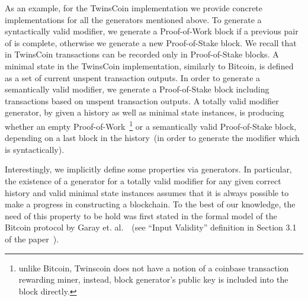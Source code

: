 As an example, for the TwinsCoin implementation we provide concrete implementations for all the generators mentioned above. To generate a syntactically valid modifier, we generate a Proof-of-Work block if a previous pair of {\em<Proof-of-Work block, Proof-of-Stake block>} is complete, otherwise we generate a new Proof-of-Stake block. We recall that in TwinsCoin transactions can be recorded only in Proof-of-Stake blocks. A minimal state in the TwinsCoin implementation, similarly to Bitcoin, is defined as a set of current unspent transaction outputs. In order to generate a semantically valid modifier, we generate a Proof-of-Stake block including transactions based on unspent transaction outputs. A totally valid modifier generator, by given a history as well as minimal state instances, is producing whether an empty Proof-of-Work~\footnote{unlike Bitcoin, Twinscoin does not have a notion of a coinbase transaction rewarding miner, instead, block generator's public key is included into the block directly.} or a semantically valid Proof-of-Stake block, depending on a last block in the history~(in order to generate the modifier which is syntactically). 

Interestingly, we implicitly define some properties via generators. In particular, the existence of a generator for a totally valid modifier for any given correct history and valid minimal state instances assumes that it is always possible to make a progress in constructing a blockchain. To the best of our knowledge, the need of this property to be hold was first stated in the formal model of the Bitcoin protocol by Garay et. al.~\cite{Garay2015}~(see ``Input Validity'' definition in Section 3.1 of the paper~\cite{Garay2015}). 



